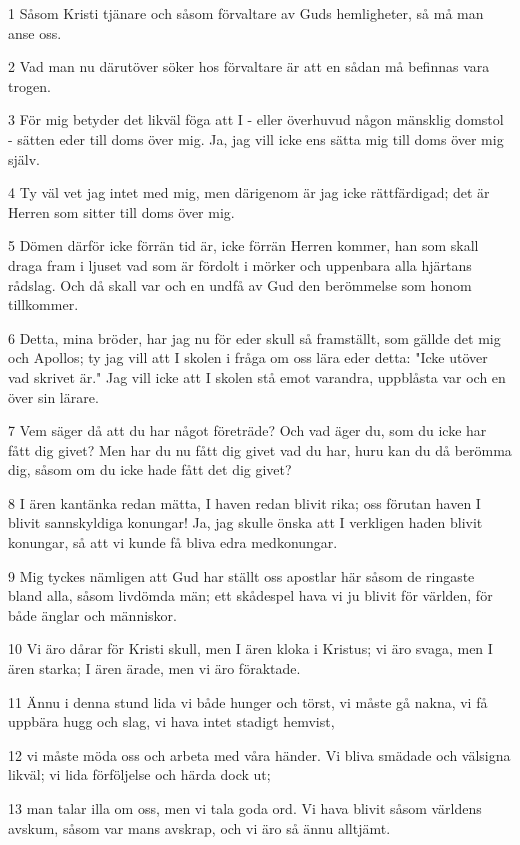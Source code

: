 \par 1 Såsom Kristi tjänare och såsom förvaltare av Guds hemligheter, så må man anse oss.
\par 2 Vad man nu därutöver söker hos förvaltare är att en sådan må befinnas vara trogen.
\par 3 För mig betyder det likväl föga att I - eller överhuvud någon mänsklig domstol - sätten eder till doms över mig. Ja, jag vill icke ens sätta mig till doms över mig själv.
\par 4 Ty väl vet jag intet med mig, men därigenom är jag icke rättfärdigad; det är Herren som sitter till doms över mig.
\par 5 Dömen därför icke förrän tid är, icke förrän Herren kommer, han som skall draga fram i ljuset vad som är fördolt i mörker och uppenbara alla hjärtans rådslag. Och då skall var och en undfå av Gud den berömmelse som honom tillkommer.
\par 6 Detta, mina bröder, har jag nu för eder skull så framställt, som gällde det mig och Apollos; ty jag vill att I skolen i fråga om oss lära eder detta: "Icke utöver vad skrivet är." Jag vill icke att I skolen stå emot varandra, uppblåsta var och en över sin lärare.
\par 7 Vem säger då att du har något företräde? Och vad äger du, som du icke har fått dig givet? Men har du nu fått dig givet vad du har, huru kan du då berömma dig, såsom om du icke hade fått det dig givet?
\par 8 I ären kantänka redan mätta, I haven redan blivit rika; oss förutan haven I blivit sannskyldiga konungar! Ja, jag skulle önska att I verkligen haden blivit konungar, så att vi kunde få bliva edra medkonungar.
\par 9 Mig tyckes nämligen att Gud har ställt oss apostlar här såsom de ringaste bland alla, såsom livdömda män; ett skådespel hava vi ju blivit för världen, för både änglar och människor.
\par 10 Vi äro dårar för Kristi skull, men I ären kloka i Kristus; vi äro svaga, men I ären starka; I ären ärade, men vi äro föraktade.
\par 11 Ännu i denna stund lida vi både hunger och törst, vi måste gå nakna, vi få uppbära hugg och slag, vi hava intet stadigt hemvist,
\par 12 vi måste möda oss och arbeta med våra händer. Vi bliva smädade och välsigna likväl; vi lida förföljelse och härda dock ut;
\par 13 man talar illa om oss, men vi tala goda ord. Vi hava blivit såsom världens avskum, såsom var mans avskrap, och vi äro så ännu alltjämt.
